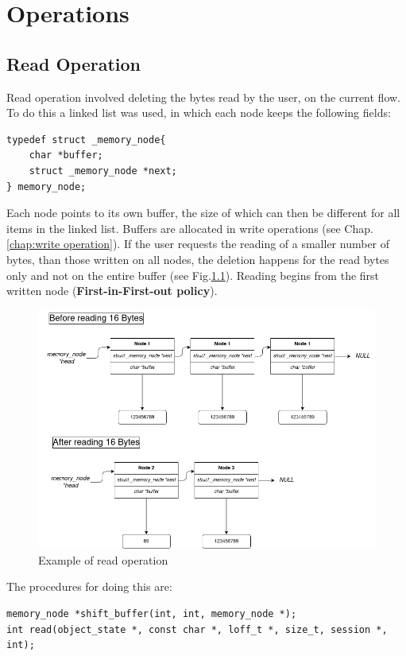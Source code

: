 \documentclass[12pt]{report}
\begin{document}
\chapter{Operations}
\section{Read Operation}

Read operation involved deleting the bytes read by the user, on the current flow. To do this a linked list was used, in which each node keeps the following fields:

\begin{lstlisting}
typedef struct _memory_node{
	char *buffer;
	struct _memory_node *next;
} memory_node;
\end{lstlisting}

Each node points to its own buffer, the size of which can then be different for all items in the linked list. Buffers are allocated in write operations (see Chap.\ref{chap:write operation}). If the user requests the reading of a smaller number of bytes, than those written on all nodes, the deletion happens for the read bytes only and not on the entire buffer (see Fig.\ref{fig:read}). Reading begins from the first written node (\textbf{First-in-First-out policy}). 

\begin{figure}[h]
	\centering
	\includegraphics[scale = .45]{read.jpg}
	\caption{Example of read operation}
	\label{fig:read}
\end{figure}

The procedures for doing this are:

\begin{lstlisting}
memory_node *shift_buffer(int, int, memory_node *);
int read(object_state *, const char *, loff_t *, size_t, session *, int);
\end{lstlisting}
\end{document}
